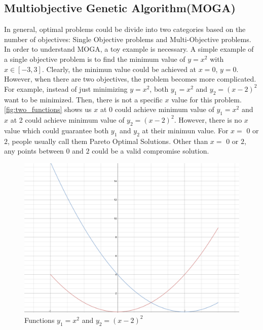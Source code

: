 \subsection{Multiobjective Genetic Algorithm(MOGA)}
In general, optimal problems could be divide into two categories based on the number of objectives: Single Objective problems and Multi-Objective problems. In order to understand MOGA, a toy example is necessary. A simple example of a single objective problem is to find the minimum value of \(y=x^2\) with \(x\in [-3,3]\). Clearly, the minimun value could be achieved at \(x=0\), \(y=0\). However, when there are two objectives, the problem becomes more complicated. For example, instead of just minimizing \(y=x^2\), both \(y_{1}=x^2\) and \(y_{2}=(x-2)^2\) want to be minimized. Then, there is not a specific \(x\) value for this problem. \autoref{fig:two_functions} shows us \(x\) at 0 could achieve minimum value of \(y_{1}=x^2\) and \(x\) at 2 could achieve minimum value of \(y_{2}=(x-2)^2\). However, there is no \(x\) value which could guarantee both \(y_{1}\) and \(y_{2}\) at their minimun value. For \(x=\) \(0\) or \(2\), people usually call them Pareto Optimal Solutions\cite{Hans_1988_Multicriteria_Pareto_Optimal}\cite{Vira_1983_Multiobjective_Pareto_Optimal}. Other than \(x=\) \(0\) or \(2\), any points between \(0\) and \(2\) could be a valid compromise solution. 

\begin{figure}[htp] 
\centering
\includegraphics[scale=.2]{images/Figure_1.png}
\caption{Functions \(y_{1}=x^2\) and \(y_{2}=(x-2)^2\)}
\label{fig:two_functions}
\end{figure}


